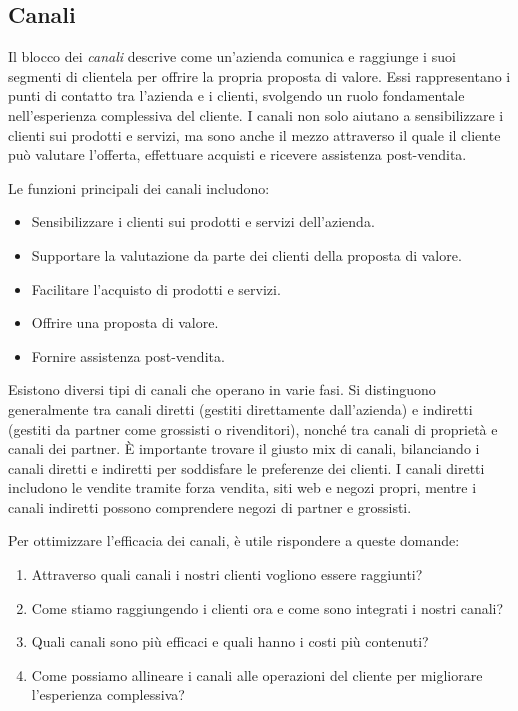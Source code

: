 \subsection*{Canali}
Il blocco dei \textit{canali} descrive come un’azienda comunica e raggiunge i suoi segmenti di clientela per offrire la propria proposta di valore. Essi rappresentano i punti di contatto tra l'azienda e i clienti, svolgendo un ruolo fondamentale nell’esperienza complessiva del cliente. I canali non solo aiutano a sensibilizzare i clienti sui prodotti e servizi, ma sono anche il mezzo attraverso il quale il cliente può valutare l’offerta, effettuare acquisti e ricevere assistenza post-vendita.

Le funzioni principali dei canali includono:
\begin{itemize}
    \item Sensibilizzare i clienti sui prodotti e servizi dell'azienda.
    \item Supportare la valutazione da parte dei clienti della proposta di valore.
    \item Facilitare l'acquisto di prodotti e servizi.
    \item Offrire una proposta di valore.
    \item Fornire assistenza post-vendita.
\end{itemize}
Esistono diversi tipi di canali che operano in varie fasi. Si distinguono generalmente tra canali diretti (gestiti direttamente dall'azienda) e indiretti (gestiti da partner come grossisti o rivenditori), nonché tra canali di proprietà e canali dei partner. È importante trovare il giusto mix di canali, bilanciando i canali diretti e indiretti per soddisfare le preferenze dei clienti. I canali diretti includono le vendite tramite forza vendita, siti web e negozi propri, mentre i canali indiretti possono comprendere negozi di partner e grossisti.

Per ottimizzare l’efficacia dei canali, è utile rispondere a queste domande:
\begin{enumerate}
    \item Attraverso quali canali i nostri clienti vogliono essere raggiunti?
    \item Come stiamo raggiungendo i clienti ora e come sono integrati i nostri canali?
    \item Quali canali sono più efficaci e quali hanno i costi più contenuti?
    \item Come possiamo allineare i canali alle operazioni del cliente per migliorare l’esperienza complessiva?
\end{enumerate}

